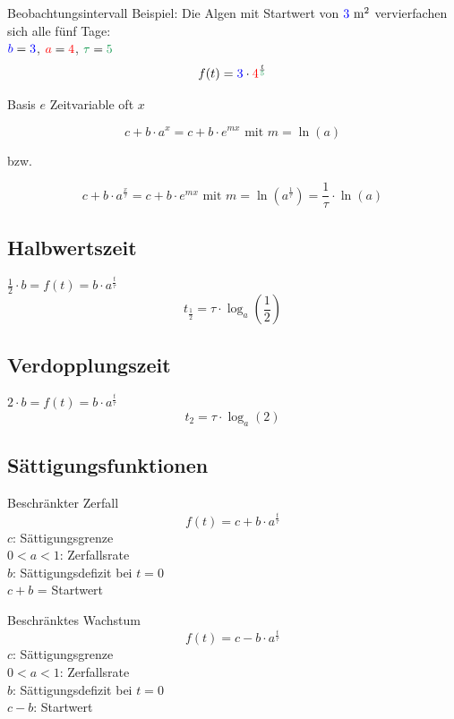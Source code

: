 \begin{multicols}{2}
\begin{rezept*}{Beobachtungsintervall}{}
Beispiel: Die Algen mit Startwert von ${\color{blue}3} \textrm{ m}^2$ ver{\color{red}vier}fachen
sich alle {\color{ForestGreen}fünf} Tage:\\
${\color{blue}b}={\color{blue}3}$, ${\color{red}a}={\color{red}4}$, ${\color{ForestGreen}\tau}={\color{ForestGreen}5}$
$$f(t)= {\color{blue}3}\cdot{}{\color{red}4}^\frac{t}{\color{ForestGreen}5}$$
\end{rezept*}


\begin{gesetz*}{Basis $e$ Zeitvariable oft $x$}{}

$$c+b\cdot{}a^x = c + b\cdot{}e^{mx} \textrm{ mit } m = \ln(a)$$

bzw.

$$c+b\cdot{}a^\frac{x}\tau = c+b\cdot{}e^{mx} \textrm{ mit }
m=\ln(a^\frac1\tau) = \frac1\tau \cdot{}\ln(a)$$

\end{gesetz*}

\subsection*{Halbwertszeit}
$\frac12 \cdot{} b = f(t) = b\cdot{}a^{\frac{t}{\tau}}$
$$t_{\frac12} = \tau\cdot{}\log_a\left(\frac12\right)$$

\subsection*{Verdopplungszeit}
$2\cdot{}b = f(t) = b\cdot{}a^{\frac{t}{\tau}}$
$$t_{2} = \tau\cdot{}\log_a(2)$$

\subsection*{Sättigungsfunktionen}
\begin{gesetz*}{Beschränkter Zerfall}{}
$$f(t) = c + b\cdot{}a^\frac{t}\tau$$
$c$: Sättigungsgrenze\\
$0<a<1$: Zerfallsrate\\
$b$: Sättigungsdefizit bei $t=0$\\
$c+b$ = Startwert 
\end{gesetz*}



\begin{gesetz*}{Beschränktes Wachstum}{}
$$f(t) = c - b\cdot{}a^\frac{t}\tau$$
$c$: Sättigungsgrenze\\
$0<a<1$: Zerfallsrate\\
$b$: Sättigungsdefizit bei $t=0$\\
$c-b$: Startwert
\end{gesetz*}


\end{multicols}
